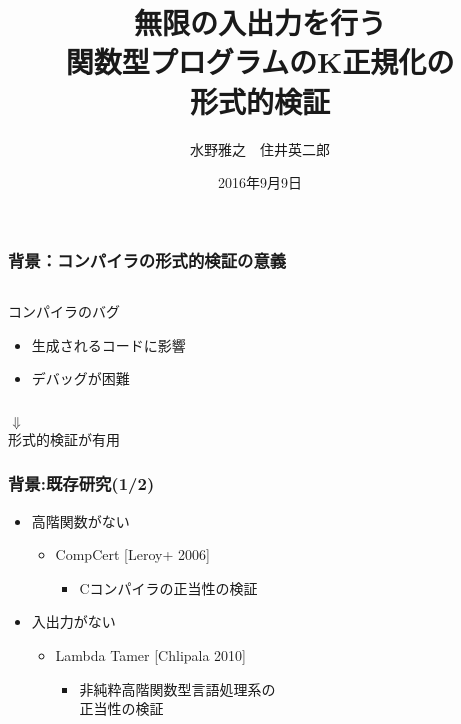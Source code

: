 \documentclass[dvipdfmx,cjk,xcolor=dvipsnames,envcountsect,notheorems,12pt]{beamer}
\title{無限の入出力を行う\\関数型プログラムのK正規化の\\形式的検証}
\author{水野雅之　住井英二郎}
\institute[東北大学　住井・松田研]{東北大学 大学院情報科学研究科}%
\date{2016年9月9日}
\theoremstyle{definition}
\begin{document}
\frame[plain]{\titlepage}%

\begin{frame}
	\frametitle{背景：コンパイラの形式的検証の意義}
	\begin{center}
		\LARGE 
		\begin{columns}
			\begin{column}{0.8\textwidth}
				\begin{itembox}[c]{コンパイラのバグ}
					\begin{itemize}
						\item 生成されるコードに影響
						\item デバッグが困難
					\end{itemize}
				\end{itembox}
			\end{column}
		\end{columns}
		$\Downarrow$\\
		形式的検証が有用
	\end{center}
\end{frame}

\begin{frame}
	\frametitle{背景:既存研究(1/2)}
	\begin{itemize}
		\item 高階関数がない
			\begin{itemize}
				\item CompCert [Leroy+ 2006]
					\begin{itemize}
						\item Cコンパイラの正当性の検証
					\end{itemize}
			\end{itemize}
		\item 入出力がない
			\begin{itemize}
				\item Lambda Tamer [Chlipala 2010]
					\begin{itemize}
						\item 非純粋高階関数型言語処理系の\\正当性の検証
					\end{itemize}
			\end{itemize}
	\end{itemize}
\end{frame}
\end{document}

